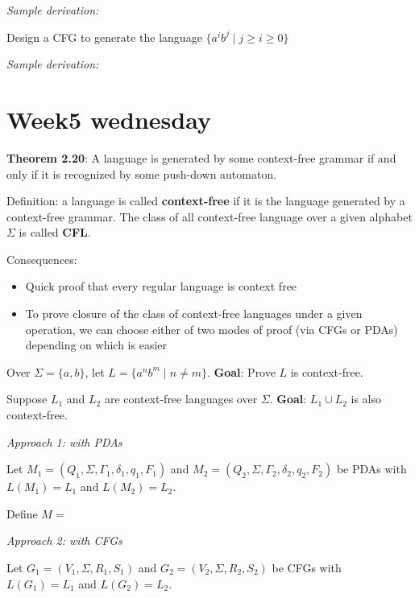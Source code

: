 \documentclass[12pt, oneside]{article}
\begin{document}
  {\it Sample derivation:} 
  
  \vspace{30pt}
  
  
  Design a CFG to generate the  language $\{a^i b^j \mid j \geq i  \geq 0\}$
  
  \vspace{150pt}
  
  {\it Sample derivation:} 
  
  \vspace{30pt}
 \vfill
\section*{Week5 wednesday}


{\bf Theorem  2.20}: A language is  generated by some context-free  grammar
if  and only if it is recognized by some push-down automaton.

Definition: a language is called {\bf context-free} if it is the language generated by a context-free grammar.
The class of all context-free language over a given alphabet $\Sigma$ is called {\bf CFL}.

Consequences:
\begin{itemize}
    \item Quick proof that every regular language is context free 
    \item To prove closure of the class of context-free languages under a given operation, we can choose 
    either of two modes 
    of proof (via CFGs or PDAs) depending on which is easier
\end{itemize}


Over $\Sigma = \{a,b\}$, let $L = \{ a^n b^m \mid n  \neq m \}$. {\bf Goal}: Prove $L$ is context-free.


\vfill

\newpage
Suppose $L_1$ and $L_2$ are context-free languages over $\Sigma$.  {\bf Goal}:  $L_1 \cup L_2$  is  also context-free.

{\it Approach 1: with  PDAs}

Let $M_1 = ( Q_1, \Sigma, \Gamma_1, \delta_1, q_1, F_1)$ and
$M_2 = ( Q_2, \Sigma, \Gamma_2, \delta_2, q_2, F_2)$ be PDAs with 
$L(M_1) =  L_1$  and  $L(M_2) = L_2$.

Define $M = $

\vfill

{\it Approach  2: with CFGs}

Let $G_1 = (V_1, \Sigma, R_1, S_1)$  and   $G_2 = (V_2, \Sigma, R_2, S_2)$  be CFGs  with
$L(G_1) =  L_1$  and  $L(G_2) = L_2$.
\end{document}
